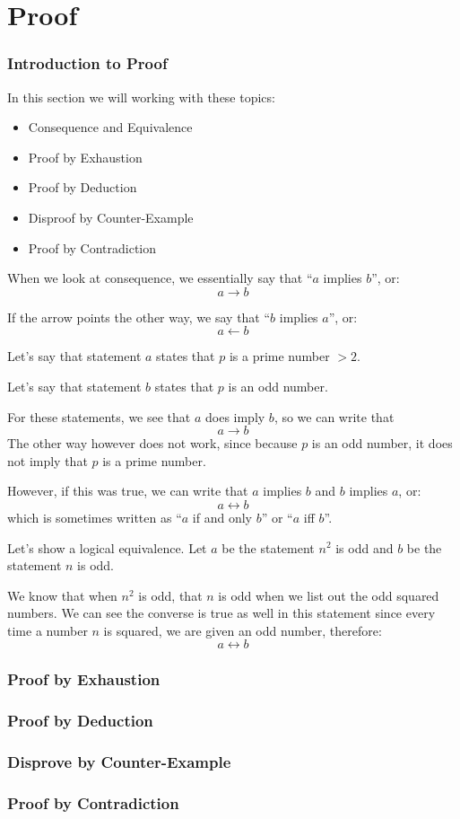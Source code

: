 \documentclass[../maths.tex]{subfiles}
\begin{document}
\chapter{Proof}
\subsection*{Introduction to Proof}
In this section we will working with these topics:
\begin{itemize}
    \item Consequence and Equivalence
    \item Proof by Exhaustion
    \item Proof by Deduction
    \item Disproof by Counter-Example
    \item Proof by Contradiction
\end{itemize}

When we look at consequence, we essentially say that ``$a$ implies $b$'', or:
\[a\rightarrow b\]

If the arrow points the other way, we say that ``$b$ implies $a$'', or:
\[a\leftarrow b\]

Let's say that statement $a$ states that $p$ is a prime number $>2$.

Let's say that statement $b$ states that $p$ is an odd number.

For these statements, we see that $a$ does imply $b$, so we can write that
\[a\rightarrow b\]
The other way however does not work, since because $p$ is an odd number, it does not imply that $p$ is a prime number.

However, if this was true, we can write that $a$ implies $b$ and $b$ implies $a$, or:
\[a\leftrightarrow b\]
which is sometimes written as ``$a$ if and only $b$'' or ``$a$ iff $b$''.

Let's show a logical equivalence. Let $a$ be the statement $n^2$ is odd and $b$ be the statement $n$ is odd.

We know that when $n^2$ is odd, that $n$ is odd when we list out the odd squared numbers. We can see the converse is true as well in this statement since every time a number $n$ is squared, we are given an odd number, therefore:
\[a\leftrightarrow b\]
\subsection*{Proof by Exhaustion}
\subsection*{Proof by Deduction}
\subsection*{Disprove by Counter-Example}
\subsection*{Proof by Contradiction}
\end{document}
